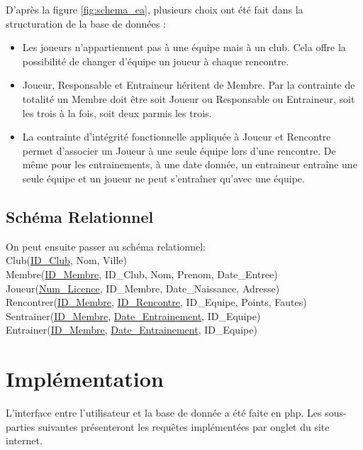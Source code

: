 \documentclass[a4paper»,8pt,french,fleqn]{report}
\begin{document}
D'après la figure \ref{fig:schema_ea}, plusieurs choix ont été fait dans la structuration de la base de données : \\

\begin{itemize}

\item Les joueurs n'appartiennent pas à une équipe mais à un club. Cela offre la possibilité de changer d'équipe un joueur à chaque rencontre. \\

\item Joueur, Responsable et Entraineur héritent de Membre. Par la contrainte de totalité un Membre doit être soit Joueur ou Responsable ou Entraineur, soit les trois à la fois, soit deux parmis les trois. \\

\item La contrainte d'intégrité fonctionnelle appliquée à Joueur et Rencontre permet d'associer un Joueur à une seule équipe lors d'une rencontre. De même pour les entrainements, à une date donnée, un entraineur entraîne une seule équipe et un joueur ne peut s'entraîner qu'avec une équipe.

\end{itemize}

\section{Schéma Relationnel}

On peut ensuite passer au schéma relationnel: \\
Club(\underline{ID\_Club}, Nom, Ville) \\ 
Membre(\underline{ID\_Membre}, ID\_Club, Nom, Prenom, Date\_Entree) \\
Joueur(\underline{Num\_Licence}, ID\_Membre, Date\_Naissance, Adresse) \\ 
Rencontrer(\underline{ID\_Membre}, \underline{ID\_Rencontre}, ID\_Equipe, Points, Fautes) \\
Sentrainer(\underline{ID\_Membre}, \underline{Date\_Entrainement}, ID\_Equipe) \\
Entrainer(\underline{ID\_Membre}, \underline{Date\_Entrainement}, ID\_Equipe) 


\chapter{Implémentation}

L'interface entre l'utilisateur et la base de donnée a été faite en php. Les sous-parties suivantes présenteront les requêtes implémentées par onglet du site internet.
\end{document}
